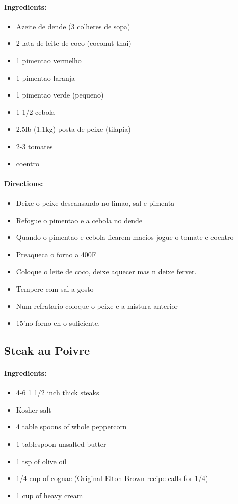 \documentclass{article}
\begin{document}
\paragraph{Ingredients:}

\begin{itemize}
	\item Azeite de dende (3 colheres de sopa)
	\item 2 lata de leite de coco (coconut thai)
	\item 1 pimentao vermelho
	\item 1 pimentao laranja
	\item 1 pimentao verde (pequeno)
	\item 1 1/2 cebola
	\item 2.5lb (1.1kg) posta de peixe (tilapia)
	\item 2-3 tomates
	\item coentro
\end{itemize}

\paragraph{Directions:}
\begin{itemize}
	\item Deixe o peixe descansando no limao, sal e pimenta
	\item Refogue o pimentao e a cebola no dende
	\item Quando o pimentao e cebola ficarem macios jogue o tomate e coentro
	\item Preaqueca o forno a 400F
	\item Coloque o leite de coco, deixe aquecer mas n deixe ferver. 
	\item Tempere com sal a gosto
	\item Num refratario coloque o peixe e a mistura anterior
	\item 15'no forno eh o suficiente.
\end{itemize} 

\subsection{Steak au Poivre}

\paragraph{Ingredients:}

\begin{itemize}
	\item 4-6 1 1/2 inch thick steaks
	\item Kosher salt
	\item 4 table spoons of whole peppercorn
	\item 1 tablespoon unsalted butter
	\item 1 tsp of olive oil
	\item 1/4 cup of cognac (Original Elton Brown recipe calls for 1/4)
	\item 1 cup of heavy cream
\end{itemize}
\end{document}
